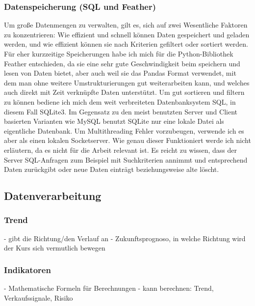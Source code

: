 \documentclass[12pt]{article}
\begin{document}
	\subsubsection{Datenspeicherung (SQL und Feather)}
		Um große Datenmengen zu verwalten, gilt es, sich auf zwei Wesentliche Faktoren zu konzentrieren: Wie effizient und schnell können Daten gespeichert und geladen werden, und wie effizient können sie nach Kriterien gefiltert oder sortiert werden. Für eher kurzzeitige Speicherungen habe ich mich für die Python-Bibliothek Feather entschieden, da sie eine sehr gute Geschwindigkeit beim speichern und lesen von Daten bietet, aber auch weil sie das Pandas Format verwendet, mit dem man ohne weitere Umstrukturierungen gut weiterarbeiten kann, und welches auch direkt mit Zeit verknüpfte Daten unterstützt. Um gut sortieren und filtern zu können bediene ich mich dem weit verbreiteten Datenbanksystem SQL, in diesem Fall SQLite3. Im Gegensatz zu den meist benutzten Server und Client basierten Varianten wie MySQL benutzt SQLite nur eine lokale Datei als eigentliche Datenbank. Um Multithreading Fehler vorzubeugen, verwende ich es aber als einen lokalen Socketserver. Wie genau dieser Funktioniert werde ich nicht erläutern, da es nicht für die Arbeit relevant ist. Es reicht zu wissen, dass der Server SQL-Anfragen zum Beispiel mit Suchkriterien annimmt und entsprechend Daten zurückgibt oder neue Daten einträgt beziehungsweise alte löscht.
\subsection{Datenverarbeitung}
	\subsubsection{Trend}
		- gibt die Richtung/den Verlauf an
		- Zukunftsprognoso, in welche Richtung wird der Kurs sich vermutlich bewegen
	\subsubsection{Indikatoren}
		- Mathematische Formeln für Berechnungen
		- kann berechnen: Trend, Verkaufssignale, Risiko
\end{document}
